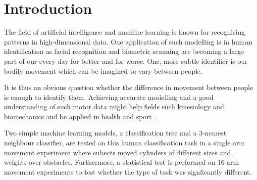 \documentclass[11pt,fleqn]{article}
\title{}
\author{Asger Schultz}
\date{\today}
\begin{document}
\maketitle
\tableofcontents
\newpage 


\section{Introduction}
The field of artificial intelligence and machine learning is known for recognising patterns in high-dimensional data. 
One application of such modelling is in human identification as facial recognition and biometric scanning are becoming a large part of our every day for better and for worse. One, more subtle identifier is our bodily movement which can be imagined to vary between people.

It is thus an obvious question whether the difference in movement between people is enough to identify them. Achieving accurate modelling and a good understanding of such motor data might help fields such kinesiology and biomechanics and be applied in health and sport \cite{kine}.

Two simple machine learning models, a classification tree and a 3-nearest neighbour classifier, are tested on this human classification task in a single arm movement experiment where subects moved cylinders of different sizes and weights over obstacles. Furthermore, a statistical test is performed on 16 arm movement experiments to test whether the type of task was signficantly different.
\end{document}
